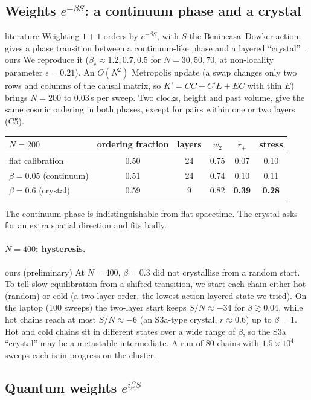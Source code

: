 \documentclass[11pt,a4paper]{article}
\newcommand{\tagbox}[2]{\textsf{\scriptsize\colorbox{#1!12}{\textcolor{#1!70!black}{#2}}}}
\newcommand{\lit}{\tagbox{blue}{literature}}
\newcommand{\ours}{\tagbox{orange}{ours}}
\begin{document}
\subsection{Weights $e^{-\beta S}$: a continuum phase and a crystal}
\lit{} Weighting $1+1$ orders by $e^{-\beta S}$, with $S$ the Benincasa--Dowker action, gives a phase transition between a continuum-like phase and a layered ``crystal''~\cite{Surya12,BHS08,GOS18}. \ours{} We reproduce it ($\beta_c\approx1.2,0.7,0.5$ for $N=30,50,70$, at non-locality parameter $\epsilon=0.21$). An $O(N^2)$ Metropolis update (a swap changes only two rows and columns of the causal matrix, so $K'=CC+C'E+EC$ with thin $E$) brings $N=200$ to $0.03$\,s per sweep. Two clocks, height and past volume, give the same cosmic ordering in both phases, except for pairs within one or two layers (C5).
\begin{center}\small
\begin{tabular}{@{}lccccc@{}}
\toprule
$N=200$ & ordering fraction & layers & $w_2$ & $r_+$ & stress\\
\midrule
flat calibration & 0.50 & 24 & 0.75 & 0.07 & 0.10\\
$\beta=0.05$ (continuum) & 0.51 & 24 & 0.74 & 0.10 & 0.11\\
$\beta=0.6$ (crystal) & 0.59 & 9 & 0.82 & \textbf{0.39} & \textbf{0.28}\\
\bottomrule
\end{tabular}
\end{center}
The continuum phase is indistinguishable from flat spacetime. The crystal asks for an extra spatial direction and fits badly.

\paragraph{$N=400$: hysteresis.} \ours{} (preliminary) At $N=400$, $\beta=0.3$ did not crystallise from a random start. To tell slow equilibration from a shifted transition, we start each chain either hot (random) or cold (a two-layer order, the lowest-action layered state we tried). On the laptop (100 sweeps) the two-layer start keeps $S/N\approx-34$ for $\beta\gtrsim0.04$, while hot chains reach at most $S/N\approx-6$ (an S3a-type crystal, $r\approx0.6$) up to $\beta=1$. Hot and cold chains sit in different states over a wide range of $\beta$, so the S3a ``crystal'' may be a metastable intermediate. A run of $80$ chains with $1.5\times10^4$ sweeps each is in progress on the cluster.

\subsection{Quantum weights $e^{i\beta S}$}
\end{document}
